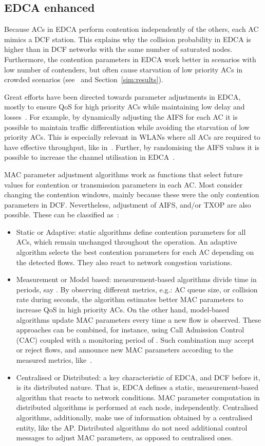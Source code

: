 \documentclass[a4paper]{article}
\begin{document}
\subsection{EDCA enhanced}
Because ACs in EDCA perform contention independently of the others, each AC mimics a DCF station. This explains why the collision probability in EDCA is higher than in DCF networks with the same number of saturated nodes. Furthermore, the contention parameters in EDCA work better in scenarios with low number of contenders, but often cause starvation of low priority ACs in crowded scenarios (see~\cite{990806} and Section~\ref{sim:results}).

Great efforts have been directed towards parameter adjustments in EDCA, mostly to ensure QoS for high priority ACs while maintaining low delay and losses~\cite{throughputGuarantees,6614899,4594854}. For example, by dynamically adjusting the AIFS for each AC it is possible to maintain traffic differentiation while avoiding the starvation of low priority ACs. This is especially relevant in WLANs where all ACs are required to have effective throughput, like in~\cite{6614899}. Further, by randomising the AIFS values it is possible to increase the channel utilisation in EDCA~\cite{4594854}. 

MAC parameter adjustment algorithms work as functions that select future values for contention or transmission parameters in each AC. Most consider changing the contention windows, mainly because these were the only contention parameters in DCF. Nevertheless, adjustment of AIFS, and/or TXOP are also possible. These can be classified as~\cite{cano2010tuning}:
	\begin{itemize}
		\item Static or Adaptive: static algorithms define contention parameters for all ACs, which remain unchanged throughout the operation. An adaptive algorithm selects the best contention parameters for each AC depending on the detected flows. They also react to network congestion variations.
		\item Measurement or Model based: measurement-based algorithms divide time in periods, say . By observing different metrics, e.g.: AC queue size, or collision rate during  seconds, the algorithm estimates better MAC parameters to increase QoS in high priority ACs. On the other hand, model-based algorithms update MAC parameters every time a new flow is observed. These approaches can be combined, for instance, using Call Admission Control (CAC) coupled with a monitoring period of . Such combination may accept or reject flows, and announce new MAC parameters according to the measured metrics, like~\cite{bellalta290call}.
		\item Centralised or Distributed: a key characteristic of EDCA, and DCF before it, is its distributed nature. That is, EDCA defines a static, measurement-based algorithm that reacts to network conditions. MAC parameter computation in distributed algorithms is performed at each node, independently. Centralised algorithms, additionally, make use of information obtained by a centralised entity, like the AP. Distributed algorithms do not need additional control messages to adjust MAC parameters, as opposed to centralised ones.
	\end{itemize} 
\end{document}
